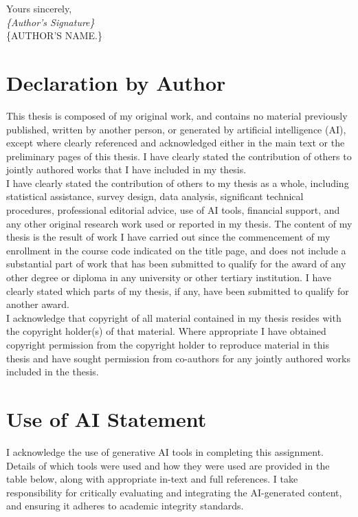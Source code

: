 \documentclass[12pt,openany,a4paper]{book}
\begin{document}
\begin{flushright}
	Yours sincerely,\\
	\medskip
	\emph{\{Author's Signature\}}\\
	\medskip
	\{AUTHOR'S NAME.\}
\end{flushright}

\chapter{Declaration by Author}

This thesis is composed of my original work, and contains no material previously published, written by another person, or generated by artificial intelligence (AI), except where clearly referenced and acknowledged either in the main text or the preliminary pages of this thesis. I have clearly stated the contribution of others to jointly authored works that I have included in my thesis.\\

I have clearly stated the contribution of others to my thesis as a whole, including statistical assistance, survey design, data analysis, significant technical procedures, professional editorial advice, use of AI tools, financial support, and any other original research work used or reported in my thesis. The content of my thesis is the result of work I have carried out since the commencement of my enrollment in the course code indicated on the title page, and does not include a substantial part of work that has been submitted to qualify for the award of any other degree or diploma in any university or other tertiary institution. I have clearly stated which parts of my thesis, if any, have been submitted to qualify for another award.\\

I acknowledge that copyright of all material contained in my thesis resides with the copyright holder(s) of that material. Where appropriate I have obtained copyright permission from the copyright holder to reproduce material in this thesis and have sought permission from co-authors for any jointly authored works included in the thesis.

\chapter{Use of AI Statement}
I acknowledge the use of generative AI tools in completing this assignment. Details of which tools were used and how they were used are provided in the table below, along with appropriate in-text and full references. I take responsibility for critically evaluating and integrating the AI-generated content, and ensuring it adheres to academic integrity standards. 
\bigskip
\end{document}
